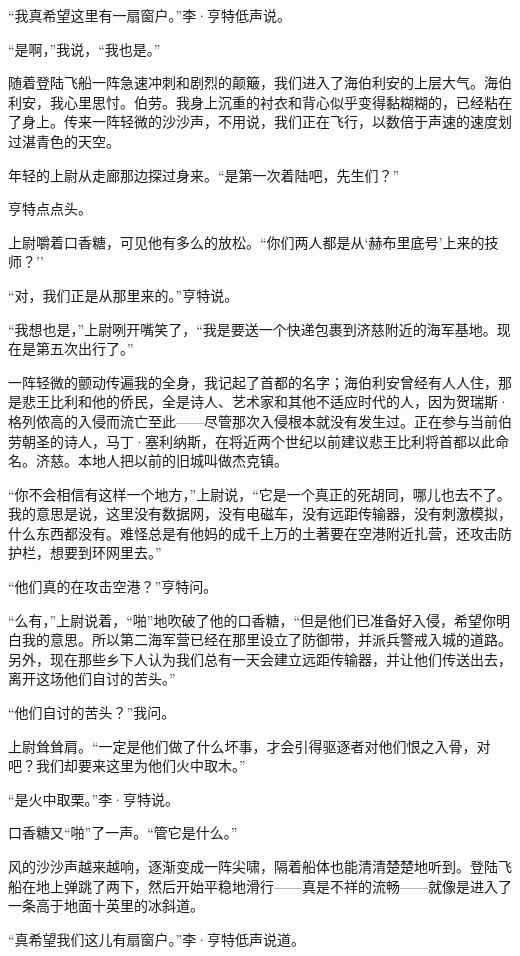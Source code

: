 \documentclass[AutoFakeBold=true]{book}
\begin{document}
``我真希望这里有一扇窗户。''李·亨特低声说。

``是啊，''我说，``我也是。''

随着登陆飞船一阵急速冲刺和剧烈的颠簸，我们进入了海伯利安的上层大气。{\kaishu 海伯利安}，我心里思忖。{\kaishu 伯劳}。我身上沉重的衬衣和背心似乎变得黏糊糊的，已经粘在了身上。传来一阵轻微的沙沙声，不用说，我们正在飞行，以数倍于声速的速度划过湛青色的天空。

年轻的上尉从走廊那边探过身来。``是第一次着陆吧，先生们？''

亨特点点头。

上尉嚼着口香糖，可见他有多么的放松。``你们两人都是从`赫布里底号'上来的技师？''

``对，我们正是从那里来的。''亨特说。

``我想也是，''上尉咧开嘴笑了，``我是要送一个快递包裹到济慈附近的海军基地。现在是第五次出行了。''

一阵轻微的颤动传遍我的全身，我记起了首都的名字；海伯利安曾经有人人住，那是悲王比利和他的侨民，全是诗人、艺术家和其他不适应时代的人，因为贺瑞斯·格列侬高的入侵而流亡至此——尽管那次入侵根本就没有发生过。正在参与当前伯劳朝圣的诗人，马丁·塞利纳斯，在将近两个世纪以前建议悲王比利将首都以此命名。{\kaishu 济慈}。本地人把以前的旧城叫做杰克镇。

``你不会相信有这样一个地方，''上尉说，``它是一个真正的死胡同，哪儿也去不了。我的意思是说，这里没有数据网，没有电磁车，没有远距传输器，没有刺激模拟，{\kaishu 什么东西都没有}。难怪总是有他妈的成千上万的土著要在空港附近扎营，还攻击防护栏，想要到环网里去。''

``他们真的在攻击空港？''亨特问。

``么有，''上尉说着，``啪''地吹破了他的口香糖，``但是他们已准备好入侵，希望你明白我的意思。所以第二海军营已经在那里设立了防御带，并派兵警戒入城的道路。另外，现在那些乡下人认为我们总有一天会建立远距传输器，并让他们传送出去，离开这场他们自讨的苦头。''

``他们自讨的苦头？''我问。

上尉耸耸肩。``一定是他们做了什么坏事，才会引得驱逐者对他们恨之入骨，对吧？我们却要来这里为他们火中取木。''

``是火中取栗。''李·亨特说。

口香糖又``啪''了一声。``管它是什么。''

风的沙沙声越来越响，逐渐变成一阵尖啸，隔着船体也能清清楚楚地听到。登陆飞船在地上弹跳了两下，然后开始平稳地滑行——真是不祥的流畅——就像是进入了一条高于地面十英里的冰斜道。

``真希望我们这儿有扇窗户。''李·亨特低声说道。
\end{document}
